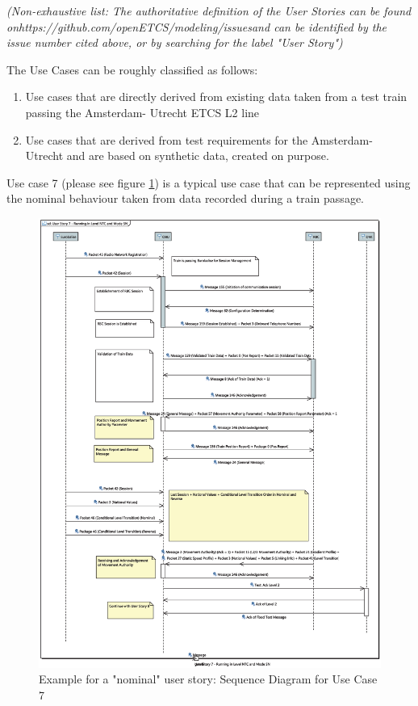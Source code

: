 \documentclass{template/openetcs_article}
\begin{document}
\emph{(Non-exhaustive list: The authoritative definition of the User Stories can be found on\newline https://github.com/openETCS/modeling/issues\newline and can be identified by the issue number cited above, or by searching for the label "User Story")}

The Use Cases can be roughly classified as follows:
\begin{enumerate}
 \item Use cases that are directly derived from existing data taken from a test train passing the Amsterdam- Utrecht ETCS L2 line
 \item Use cases that are derived from test requirements for the Amsterdam- Utrecht and are based on synthetic data, created on purpose.
\end {enumerate}

Use case 7 (please see figure \ref{fig:us07}) is a typical use case that can be represented using the nominal behaviour taken from data recorded during a train passage.

\begin{figure}
  \centering
  \includegraphics[width=6.5in]{images/UserStory7-2-sequence.eps}
  \caption{Example for a "nominal" user story: Sequence Diagram for Use Case 7}
  \label{fig:us07}
\end{figure}
\end{document}
